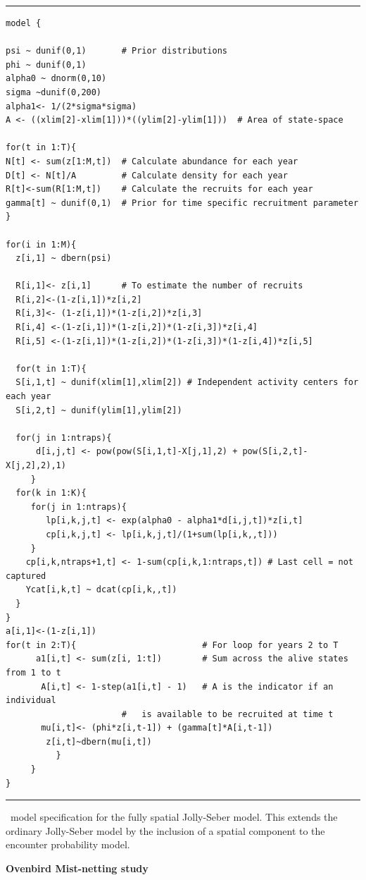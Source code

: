 \begin{panel}[htp]
\centering
\rule[0.1in]{\textwidth}{.03in}
{\small
\begin{verbatim}
model {

psi ~ dunif(0,1)       # Prior distributions
phi ~ dunif(0,1)
alpha0 ~ dnorm(0,10)
sigma ~dunif(0,200)
alpha1<- 1/(2*sigma*sigma)
A <- ((xlim[2]-xlim[1]))*((ylim[2]-ylim[1]))  # Area of state-space

for(t in 1:T){
N[t] <- sum(z[1:M,t])  # Calculate abundance for each year
D[t] <- N[t]/A	       # Calculate density for each year
R[t]<-sum(R[1:M,t])    # Calculate the recruits for each year
gamma[t] ~ dunif(0,1)  # Prior for time specific recruitment parameter
}

for(i in 1:M){
  z[i,1] ~ dbern(psi)

  R[i,1]<- z[i,1]      # To estimate the number of recruits
  R[i,2]<-(1-z[i,1])*z[i,2]
  R[i,3]<- (1-z[i,1])*(1-z[i,2])*z[i,3]
  R[i,4] <-(1-z[i,1])*(1-z[i,2])*(1-z[i,3])*z[i,4]
  R[i,5] <-(1-z[i,1])*(1-z[i,2])*(1-z[i,3])*(1-z[i,4])*z[i,5]

  for(t in 1:T){
  S[i,1,t] ~ dunif(xlim[1],xlim[2]) # Independent activity centers for each year
  S[i,2,t] ~ dunif(ylim[1],ylim[2])

  for(j in 1:ntraps){
      d[i,j,t] <- pow(pow(S[i,1,t]-X[j,1],2) + pow(S[i,2,t]-X[j,2],2),1)
     }
  for(k in 1:K){
     for(j in 1:ntraps){
        lp[i,k,j,t] <- exp(alpha0 - alpha1*d[i,j,t])*z[i,t]
        cp[i,k,j,t] <- lp[i,k,j,t]/(1+sum(lp[i,k,,t]))
     }
    cp[i,k,ntraps+1,t] <- 1-sum(cp[i,k,1:ntraps,t]) # Last cell = not captured
    Ycat[i,k,t] ~ dcat(cp[i,k,,t])
  }
}
a[i,1]<-(1-z[i,1])
for(t in 2:T){                         # For loop for years 2 to T
      a1[i,t] <- sum(z[i, 1:t])        # Sum across the alive states from 1 to t
       A[i,t] <- 1-step(a1[i,t] - 1)   # A is the indicator if an individual
				       #   is available to be recruited at time t
       mu[i,t]<- (phi*z[i,t-1]) + (gamma[t]*A[i,t-1])
        z[i,t]~dbern(mu[i,t])
          }
     }
}
\end{verbatim}
}
\rule[-0.1in]{\textwidth}{.03in}
\caption{
\jags~model specification for the fully spatial Jolly-Seber
model. This extends the ordinary Jolly-Seber model by the inclusion of
a spatial component to the encounter probability model. }
\label{open.panel.spatialJS}
\end{panel}


{\bf Ovenbird Mist-netting study}

